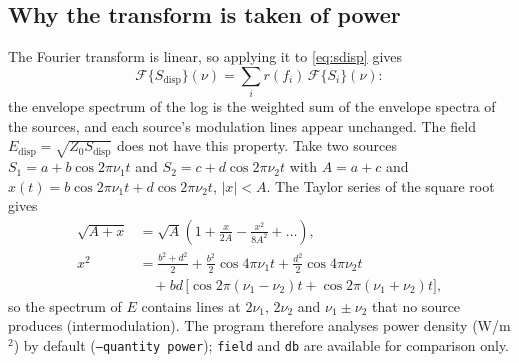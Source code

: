 \documentclass[10pt,letterpaper]{article}
\numberwithin{equation}{section}
\begin{document}
\subsection{Why the transform is taken of power}\label{sec:whypower}
The Fourier transform is linear, so applying it to \eqref{eq:sdisp} gives
\begin{equation}
\mathcal{F}\{S_\mathrm{disp}\}(\nu) = \sum_i r(f_i)\,\mathcal{F}\{S_i\}(\nu):
\label{eq:linear}
\end{equation}
the envelope spectrum of the log is the weighted sum of the envelope spectra of
the sources, and each source's modulation lines appear unchanged. The field
$E_\mathrm{disp} = \sqrt{Z_0 S_\mathrm{disp}}$ does not have this property. Take
two sources $S_1 = a + b\cos 2\pi\nu_1 t$ and $S_2 = c + d\cos 2\pi\nu_2 t$ with
$A = a+c$ and $x(t) = b\cos 2\pi\nu_1 t + d\cos 2\pi\nu_2 t$, $|x| < A$. The
Taylor series of the square root gives
\begin{align}
\sqrt{A + x} &= \sqrt{A}\left(1 + \frac{x}{2A} - \frac{x^2}{8A^2} + \dots\right),\\
x^2 &= \frac{b^2+d^2}{2} + \frac{b^2}{2}\cos 4\pi\nu_1 t + \frac{d^2}{2}\cos 4\pi\nu_2 t \nonumber\\
 &\quad + bd\,\big[\cos 2\pi(\nu_1-\nu_2)t + \cos 2\pi(\nu_1+\nu_2)t\big],
\end{align}
so the spectrum of $E$ contains lines at $2\nu_1$, $2\nu_2$ and
$\nu_1\pm\nu_2$ that no source produces (intermodulation). The program
therefore analyses power density (W/m$^2$) by default (\texttt{--quantity power});
\texttt{field} and \texttt{db} are available for comparison only.
\end{document}
